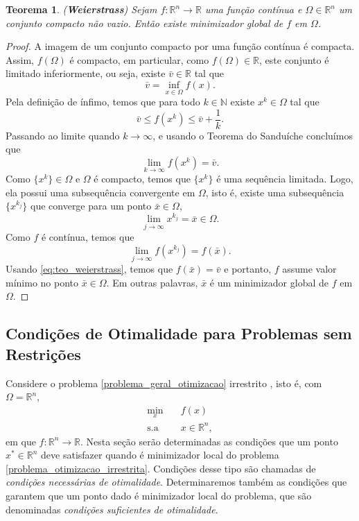 \documentclass[12pt,a4paper]{scrartcl}
\def\RR{\mathds{R}}
\newtheorem{teo}{Teorema}
\theoremstyle{definition}%
\begin{document}
\begin{teo}(\textbf{Weierstrass}) \label{teo:weierstrass}
Sejam $f: \RR^{n} \rightarrow \RR$ uma função contínua e $\Omega \in \RR^{n}$ um conjunto compacto não vazio. Então existe minimizador global de $f$ em $\Omega$.
\end{teo}
\begin{proof}
A imagem de um conjunto compacto por uma função contínua é compacta. Assim, $f(\Omega)$ é compacto, em particular, como $f(\Omega) \in \RR$, este conjunto é limitado inferiormente, ou seja, existe $\bar{v} \in \RR$ tal que
\[
\bar{v} = \inf_{x\in \Omega} f(x).
\]
Pela definição de ínfimo, temos que para todo $k\in \mathds{N}$ existe $x^{k} \in \Omega$ tal que 
\[
\bar{v} \leq f(x^{k}) \leq \bar{v} + \dfrac{1}{k} .
\]
Passando ao limite quando $k \rightarrow \infty $, e usando o Teorema do Sanduíche concluímos que
\[\label{eq:teo_weierstrass}
\displaystyle\lim_{k \rightarrow \infty} f(x^{k}) = \bar{v}.
\]
Como $\{ x^{k} \} \in \Omega$ e $\Omega$ é compacto, temos que $\{ x^{k} \}$ é uma sequência limitada. Logo, ela possui uma subsequência convergente em $\Omega$, isto é, existe uma subsequência $\{ x^{k_{j}} \}$ que converge para um ponto $\bar{x} \in \Omega$,
\[
\displaystyle\lim_{j \rightarrow \infty} x^{k_{j}} = \bar{x} \in \Omega .
\]
Como $f$ é contínua, temos que
\[
\displaystyle\lim_{j \rightarrow \infty} f(x^{k_{j}}) = f(\bar{x}).
\]
Usando \eqref{eq:teo_weierstrass}, temos que $f(\bar{x}) = \bar{v}$ e portanto, $f$ assume valor mínimo no ponto $\bar{x} \in \Omega$. Em outras palavras, $\bar{x}$ é um minimizador global de $f$ em $\Omega$.
\end{proof}


\subsection{Condições de Otimalidade para Problemas sem Restrições} \label{subsection:irrestrito}

Considere o problema \eqref{problema_geral_otimizacao} irrestrito , isto é, com $\Omega = \RR^{n}$,
\[ \label{problema_otimizacao_irrestrita}
\begin{aligned}
\min_{x} & \quad f(x) \\
\text{s.a} & \quad x \in \RR^{n} ,
\end{aligned}
\]
em que $f:\RR^{n} \rightarrow \RR$. Nesta seção serão determinadas as condições que um ponto $x^{*} \in \RR^{n}$ deve satisfazer quando é minimizador local do problema \eqref{problema_otimizacao_irrestrita}. Condições desse tipo são chamadas de \emph{condições necessárias de otimalidade}. Determinaremos também as condições que garantem que um ponto dado é minimizador local do problema, que são denominadas \emph{condições suficientes de otimalidade}. 
\end{document}
